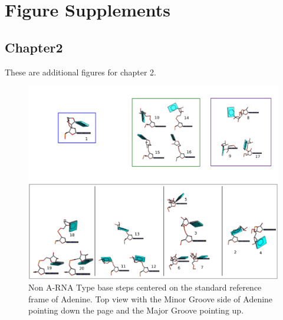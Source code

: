 \chapter{Figure Supplements}
\label{supplementes}

\section{Chapter2}
These are additional figures for chapter 2.

\begin{figure}[t]
\centering
\includegraphics[angle=90, scale=0.5]{Supplement/collage2.png}
\caption{Non A-RNA Type base steps centered on the standard reference
  frame of Adenine. Top view with the Minor Groove side of Adenine
  pointing down the page and the Major Groove pointing up.}
\label{fig:steps2}
\end{figure}





